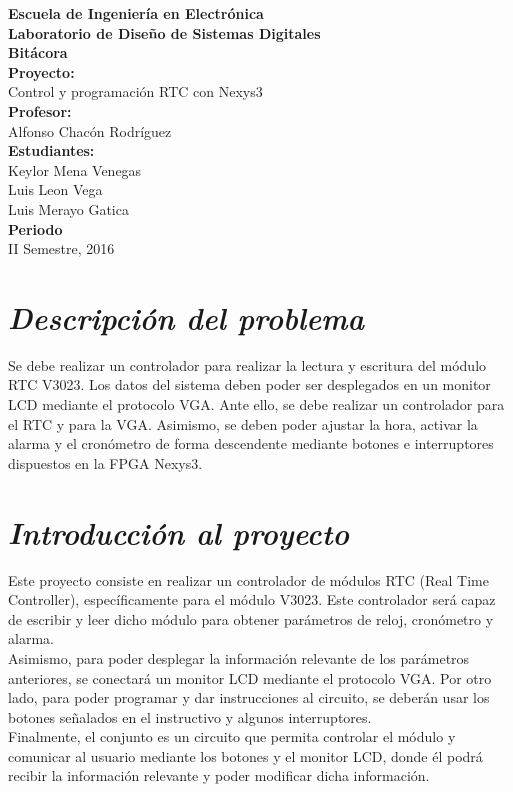 \documentclass[12pt,a4paper]{report}
\begin{document}
\begin{titlepage}
\begin{center}
\vspace*{1.5cm}
\textbf{Escuela de Ingeniería en Electrónica}\\[0.8cm]
\textbf{Laboratorio de Diseño de Sistemas Digitales}\\[1cm]
\textbf{Bitácora}\\[2cm]
\textbf{Proyecto:}\\[0.4cm]
Control y programación RTC con Nexys3 \\[1.7cm]
\textbf{Profesor:}\\[0.4cm]
Alfonso Chacón Rodríguez \\[1.7cm]
\textbf{Estudiantes:}\\[0.4cm]
Keylor Mena Venegas \\[0.8cm]
Luis Leon Vega \\[0.8cm]
Luis Merayo Gatica \\[1.7cm]
\textbf{Periodo}\\[0.8cm]
II Semestre, 2016\\
\end{center}
\end{titlepage}


\section*{\textit{Descripción del problema}}

Se debe realizar un controlador para realizar la lectura y escritura del módulo RTC V3023. Los datos del sistema deben poder ser desplegados en un monitor LCD mediante el protocolo VGA. Ante ello, se debe realizar un controlador para el RTC y para la VGA. Asimismo, se deben poder ajustar la hora, activar la alarma y el cronómetro de forma descendente mediante botones e interruptores dispuestos en la FPGA Nexys3.

\section*{\textit{Introducción al proyecto}}

Este proyecto consiste en realizar un controlador de módulos RTC (Real Time Controller), específicamente para el módulo V3023. Este controlador será capaz de escribir y leer dicho módulo para obtener parámetros de reloj, cronómetro y alarma. \\
Asimismo, para poder desplegar la información relevante de los parámetros anteriores, se conectará un monitor LCD mediante el protocolo VGA. Por otro lado, para poder programar y dar instrucciones al circuito, se deberán usar los botones señalados en el instructivo y algunos interruptores. \\
Finalmente, el conjunto es un circuito que permita controlar el módulo y comunicar al usuario mediante los botones y el monitor LCD, donde él podrá recibir la información relevante y poder modificar dicha información.\\
\end{document}
